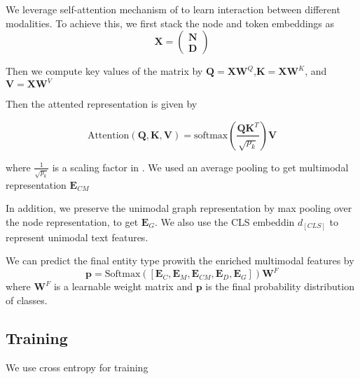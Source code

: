 We leverage self-attention mechanism of \cite{transformer} to learn interaction between different modalities. To achieve this, we first stack the node and token embeddings as $$\mathbf{X}=\begin{pmatrix}
\mathbf{N} \\
\mathbf{D}
\end{pmatrix}$$

Then we compute key values of the matrix by $\mathbf{Q}=\mathbf{X}\mathbf{W}^Q$,$\mathbf{K}=\mathbf{X}\mathbf{W}^K$, and $\mathbf{V}=\mathbf{X}\mathbf{W}^V$


Then the attented representation is given by 

$$\text{Attention}(\mathbf{Q},\mathbf{K},\mathbf{V})=\text{softmax}(\frac{\mathbf{Q}\mathbf{K}^T}{\sqrt{p_k}})\mathbf{V}$$

where $\frac{1}{\sqrt{p_k}}$ is a scaling factor in \cite{transformer}. We used an average pooling to get multimodal representation $\mathbf{E}_{CM}$

In addition, we preserve the unimodal graph representation by max pooling over the node representation, to get $\mathbf{E}_{G}$. We also use the CLS embeddin  $d_{[CLS]}$ to represent unimodal text features.


We can predict the final entity type prowith the enriched multimodal features by
$$\mathbf{p}=\text{Softmax}([\mathbf{E}_{C}, \mathbf{E}_{M}, \mathbf{E}_{CM}, \mathbf{E}_{D}, \mathbf{E}_{G}])\mathbf{W}^F$$ where $\mathbf{W}^F$ is a learnable weight matrix and $\mathbf{p}$ is the final probability distribution of classes.


\subsection{Training}
We use cross entropy for training 








